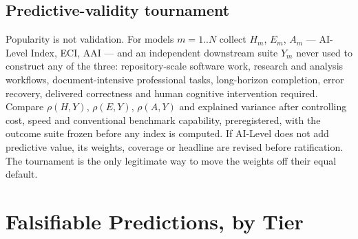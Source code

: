 \documentclass[11pt]{article}
\theoremstyle{definition}
\begin{document}
\subsection{Predictive-validity tournament}\label{sec:tournament}
Popularity is not validation. For models $m = 1..N$ collect $H_m$, $E_m$, $A_m$ --- AI-Level Index, ECI, AAI --- and an independent downstream suite $Y_m$ never used to construct any of the three: repository-scale software work, research and analysis workflows, document-intensive professional tasks, long-horizon completion, error recovery, delivered correctness and human cognitive intervention required. Compare $\rho(H, Y)$, $\rho(E, Y)$, $\rho(A, Y)$ and explained variance after controlling cost, speed and conventional benchmark capability, preregistered, with the outcome suite frozen before any index is computed. If AI-Level does not add predictive value, its weights, coverage or headline are revised before ratification. The tournament is the only legitimate way to move the weights off their equal default.

\section{Falsifiable Predictions, by Tier}\label{sec:predictions}
\end{document}
